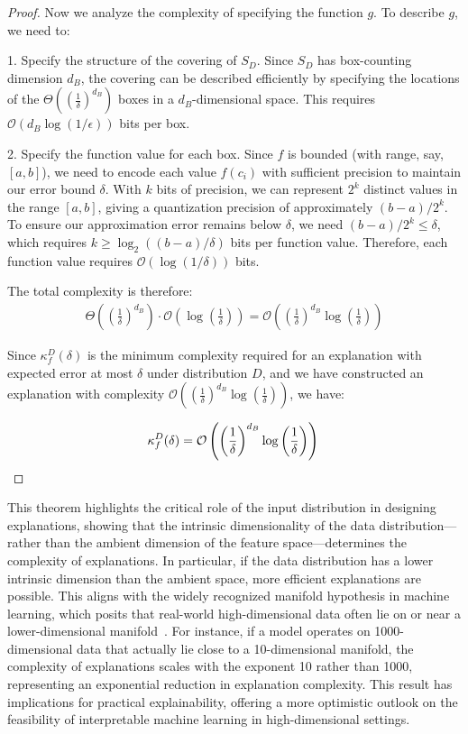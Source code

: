 \documentclass[11pt,letter,leqno]{article}
\begin{document}
\begin{proof}
Now we analyze the complexity of specifying the function $g$.  To describe $g$, we need to:

1. Specify the structure of the covering of $S_D$.  Since $S_D$ has box-counting dimension $d_B$, the covering can be described efficiently by specifying the locations of the $\Theta\left(\left(\frac{1}{\delta}\right)^{d_B}\right)$ boxes in a $d_B$-dimensional space.  This requires $\mathcal{O}(d_B \log(1/\epsilon))$ bits per box.

2. Specify the function value for each box.  Since $f$ is bounded (with range, say, $[a,b]$), we need to encode each value $f(c_i)$ with sufficient precision to maintain our error bound $\delta$.  With $k$ bits of precision, we can represent $2^k$ distinct values in the range $[a,b]$, giving a quantization precision of approximately $(b-a)/2^k$.  To ensure our approximation error remains below $\delta$, we need $(b-a)/2^k \leq \delta$, which requires $k \geq \log_2((b-a)/\delta)$ bits per function value.  Therefore, each function value requires $\mathcal{O}(\log(1/\delta))$ bits.

The total complexity is therefore:
\begin{align}
\Theta\left(\left(\frac{1}{\delta}\right)^{d_B}\right) \cdot \mathcal{O}\left(\log\left(\frac{1}{\delta}\right)\right) = \mathcal{O}\left(\left(\frac{1}{\delta}\right)^{d_B} \log\left(\frac{1}{\delta}\right)\right)
\end{align}

Since $\kappa_f^D(\delta)$ is the minimum complexity required for an explanation with expected error at most $\delta$ under distribution $D$, and we have constructed an explanation with complexity $\mathcal{O}\left(\left(\frac{1}{\delta}\right)^{d_B} \log\left(\frac{1}{\delta}\right)\right)$, we have:

\[ \kappa_f^D(\delta) = \mathcal{O}\left(\left(\frac{1}{\delta}\right)^{d_B} \log\left(\frac{1}{\delta}\right)\right) \qedhere \]

\end{proof}

This theorem highlights the critical role of the input distribution in designing explanations, showing that the intrinsic dimensionality of the data distribution---rather than the ambient dimension of the feature space---determines the complexity of explanations.  In particular, if the data distribution has a lower intrinsic dimension than the ambient space, more efficient explanations are possible.  This aligns with the widely recognized manifold hypothesis in machine learning, which posits that real-world high-dimensional data often lie on or near a lower-dimensional manifold~\cite{Ma2011, Narayanan2010}.  For instance, if a model operates on 1000-dimensional data that actually lie close to a 10-dimensional manifold, the complexity of explanations scales with the exponent 10 rather than 1000, representing an exponential reduction in explanation complexity.  This result has implications for practical explainability, offering a more optimistic outlook on the feasibility of interpretable machine learning in high-dimensional settings.
\end{document}
